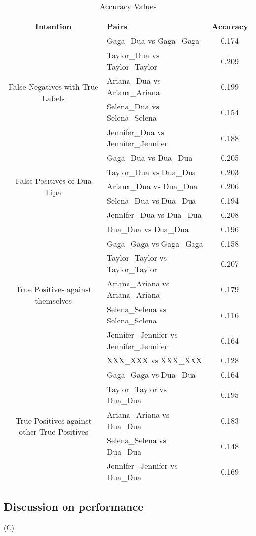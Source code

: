 \documentclass[a4paper,11pt]{article}
\begin{document}
\begin{table}[htbp]
\centering
\caption{Accuracy Values}
\begin{tabular}{|c|l|c|}
\hline
\textbf{Intention} & \textbf{Pairs} & \textbf{Accuracy} \\ \hline
\multirow{5}{*}{False Negatives with True Labels} & Gaga\_Dua vs Gaga\_Gaga & 0.174 \\
& Taylor\_Dua vs Taylor\_Taylor & 0.209 \\
& Ariana\_Dua vs Ariana\_Ariana & 0.199 \\
& Selena\_Dua vs Selena\_Selena & 0.154 \\
& Jennifer\_Dua vs Jennifer\_Jennifer & 0.188 \\
\hline
\multirow{5}{*}{False Positives of Dua Lipa} & Gaga\_Dua vs Dua\_Dua & 0.205 \\
& Taylor\_Dua vs Dua\_Dua & 0.203 \\
& Ariana\_Dua vs Dua\_Dua & 0.206 \\
& Selena\_Dua vs Dua\_Dua & 0.194 \\
& Jennifer\_Dua vs Dua\_Dua & 0.208 \\
\hline
\multirow{7}{*}{True Positives against themselves} & Dua\_Dua vs Dua\_Dua & 0.196 \\
& Gaga\_Gaga vs Gaga\_Gaga & 0.158 \\
& Taylor\_Taylor vs Taylor\_Taylor & 0.207 \\
& Ariana\_Ariana vs Ariana\_Ariana & 0.179 \\
& Selena\_Selena vs Selena\_Selena & 0.116 \\
& Jennifer\_Jennifer vs Jennifer\_Jennifer & 0.164 \\
& XXX\_XXX vs XXX\_XXX & 0.128 \\
\hline
\multirow{5}{*}{True Positives against other True Positives} & Gaga\_Gaga vs Dua\_Dua & 0.164 \\
& Taylor\_Taylor vs Dua\_Dua & 0.195 \\
& Ariana\_Ariana vs Dua\_Dua & 0.183 \\
& Selena\_Selena vs Dua\_Dua & 0.148 \\
& Jennifer\_Jennifer vs Dua\_Dua & 0.169 \\
\hline
\end{tabular}
\label{tab:accuracy}
\end{table}







\subsection{Discussion on performance}
(C)
\end{document}

